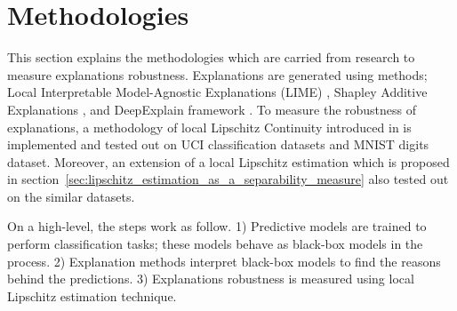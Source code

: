 \documentclass[english]{tktltiki2}
\theoremstyle{definition}
\theoremstyle{remark}
\begin{document}



\section{Methodologies}\label{sec:methodologies} %
This section explains the methodologies which are carried from research to measure explanations robustness. Explanations are generated using methods; Local Interpretable Model-Agnostic Explanations (LIME) \citep{ribeiro2016should}, Shapley Additive Explanations \citep{lundberg2017unified}, and DeepExplain framework \citep{ancona2017towards}. To measure the robustness of explanations, a methodology of local Lipschitz Continuity introduced in \citet{alvarez2018robustness} is implemented and tested out on UCI classification datasets and MNIST digits dataset. Moreover, an extension of a local Lipschitz estimation which is proposed in section~\ref{sec:lipschitz_estimation_as_a_separability_measure} also tested out on the similar datasets.

On a high-level, the steps work as follow. 1) Predictive models are trained to perform classification tasks; these models behave as black-box models in the process. 2) Explanation methods interpret black-box models to find the reasons behind the predictions. 3) Explanations robustness is measured using local Lipschitz estimation technique.
\end{document}

